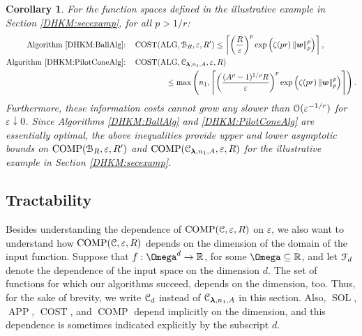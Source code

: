 \documentclass[USenglish]{article}
\theoremstyle{dgthm}
\theoremstyle{dgthm}
\theoremstyle{dgthm}
\newtheorem{corollary}[theorem]{Corollary}
\theoremstyle{dgthm}
\theoremstyle{dgdef}
\theoremstyle{definition}
\DeclareMathOperator{\DHKMSOL}{SOL}
\DeclareMathOperator{\DHKMAPP}{APP}
\DeclareMathOperator{\DHKMALG}{ALG}
\DeclareMathOperator{\DHKMCOST}{COST}
\DeclareMathOperator{\DHKMCOMP}{COMP}
\newcommand{\DHKMnorm}[2][{}]{\ensuremath{\left \lVert #2 \right \rVert}_{#1}}
\begin{document}
\begin{corollary}\label{DHKM:cor:illex} 
For the function spaces defined in the illustrative example in Section \ref{DHKM:secexamp}, for all $p > 1/r$:
\begin{align*}
    \text{Algorithm \ref{DHKM:BallAlg}:} \quad& \DHKMCOST(\DHKMALG,\calB_R,\varepsilon, R') 
    \le \left \lceil  \left(\frac{R}{\varepsilon}\right)^p  \exp\left( \zeta(pr) \DHKMnorm[p]{\bsw}^p  \right)    \right \rceil, \\
    \text{Algorithm \ref{DHKM:PilotConeAlg}:} \quad& \DHKMCOST(\DHKMALG,\calC_{\bslambda,n_1,A},\varepsilon, R) 
    \\ & \qquad \qquad \le \max \left( n_1, 
    \left \lceil  \left(\frac{(A^\rho-1)^{1/\rho}R}{\varepsilon}\right)^p  \exp\left( \zeta(pr) \DHKMnorm[p]{\bsw}^p  \right)    \right \rceil \right).
    \end{align*}
Furthermore, these information costs cannot grow any slower than ${\mathcal{O}}(\varepsilon^{-1/r})$ for $\varepsilon \downarrow 0$. Since Algorithms \ref{DHKM:BallAlg} and \ref{DHKM:PilotConeAlg} are essentially optimal, the above inequalities provide upper and lower asymptotic bounds on  $\DHKMCOMP(\calB_R,\varepsilon,R')$ and $\DHKMCOMP(\calC_{\bslambda,n_1,A},\varepsilon,R)$ for the illustrative example in Section \ref{DHKM:secexamp}.
\end{corollary}




\subsection{Tractability}\label{DHKM:SecPilotTract}


Besides understanding the dependence of $\DHKMCOMP(\calC, \varepsilon,R)$ on $\varepsilon$, we also want to understand how $\DHKMCOMP(\calC, \varepsilon,R)$ depends on the dimension of the domain of the input function.  Suppose that $f: \Omega^d \to \R$, for some $\Omega \subseteq \R$, and let ${\mathcal{F}}_d$ denote the dependence of the input space on the dimension $d$.  
The set of functions for which our algorithms succeed, depends on the dimension, too. Thus, for the sake of brevity, we write ${\mathcal{C}}_d$ instead of ${\mathcal{C}}_{{\boldsymbol{\lambda}},n_1,A}$ in this section. Also, $\DHKMSOL$, $\DHKMAPP$, $\DHKMCOST$, and $\DHKMCOMP$ depend implicitly on the dimension, and this dependence is sometimes indicated explicitly by the subscript $d$.

\bigskip
\end{document}
